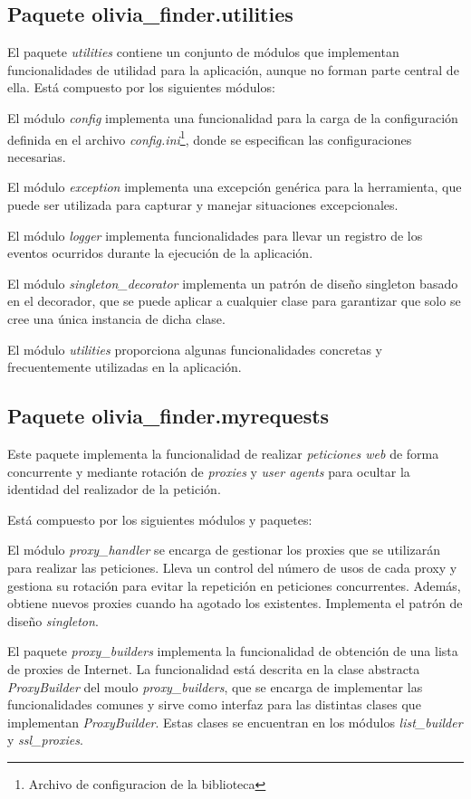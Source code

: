 \subsection{Paquete olivia\_finder.utilities}

El paquete \textit{utilities} contiene un conjunto de módulos que implementan funcionalidades de 
utilidad para la aplicación, aunque no forman parte central de ella. Está compuesto por los siguientes módulos:

El módulo \textit{config} implementa una funcionalidad para la carga de la configuración 
definida en el archivo \textit{config.ini}\footnote{Archivo de configuracion de la biblioteca}, donde se especifican las configuraciones necesarias.

El módulo \textit{exception} implementa una excepción genérica para la herramienta, que 
puede ser utilizada para capturar y manejar situaciones excepcionales.

El módulo \textit{logger} implementa funcionalidades para llevar un registro de los 
eventos ocurridos durante la ejecución de la aplicación.

El módulo \textit{singleton\_decorator} implementa un patrón de diseño singleton basado 
en el decorador, que se puede aplicar a cualquier clase para garantizar que solo se cree una 
única instancia de dicha clase.

El módulo \textit{utilities} proporciona algunas funcionalidades concretas y frecuentemente 
utilizadas en la aplicación.

\subsection{Paquete olivia\_finder.myrequests}

Este paquete implementa la funcionalidad de realizar \textit{peticiones web} de forma concurrente 
y mediante rotación de \textit{proxies} y \textit{user agents} para ocultar la identidad del realizador
 de la petición.

Está compuesto por los siguientes módulos y paquetes:

El módulo \textit{proxy\_handler} se encarga de gestionar los proxies que se utilizarán para 
realizar las peticiones. Lleva un control del número de usos de cada proxy y gestiona su rotación 
para evitar la repetición en peticiones concurrentes. Además, obtiene nuevos proxies cuando ha 
agotado los existentes. Implementa el patrón de diseño \textit{singleton}.

El paquete \textit{proxy\_builders} implementa la funcionalidad de obtención de una lista de 
proxies de Internet. La funcionalidad está descrita en la clase abstracta \textit{ProxyBuilder} del moulo \textit{proxy\_builders}, 
que se encarga de implementar las funcionalidades comunes y sirve como interfaz para las distintas 
clases que implementan \textit{ProxyBuilder}. Estas clases se encuentran en los
 módulos \textit{list\_builder} y \textit{ssl\_proxies}.

